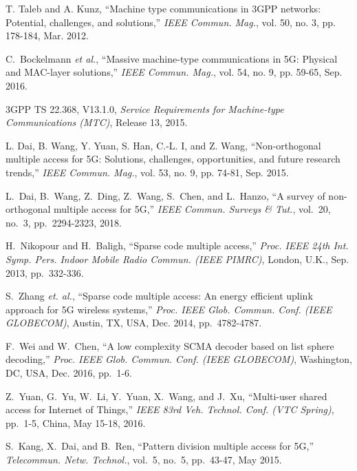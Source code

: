 \documentclass[journal]{IEEEtran}
\numberwithin{const2}{const}
\begin{document}
\begin{thebibliography}{1}
	
	T. Taleb and A. Kunz,
	``Machine type communications in 3GPP networks: Potential, challenges, and solutions,''
	\emph{IEEE Commun. Mag.}, vol. 50, no. 3, pp. 178-184, Mar. 2012.
	
	C.~Bockelmann \emph{et al.}, %
	``Massive machine-type communications in 5G: Physical and MAC-layer solutions,''
	\emph{IEEE Commun. Mag.}, vol. 54, no. 9, pp. 59-65, Sep. 2016.	
	
	3GPP TS 22.368, V13.1.0,
	\emph{Service Requirements for Machine-type Communications (MTC)}, Release 13, 2015.	
	
	L. Dai, B. Wang, Y. Yuan, S. Han, C.-L. I, and Z. Wang,
	``Non-orthogonal multiple access for 5G: Solutions, challenges, opportunities, and future research trends,''
	\emph{IEEE Commun. Mag.}, vol. 53, no. 9, pp. 74-81, Sep. 2015.
	
	L.~Dai, B.~Wang, Z.~Ding, Z.~Wang, S.~Chen, and L.~Hanzo,
	``A survey of non-orthogonal multiple access for 5G,''
	\emph{IEEE Commun. Surveys \& Tut.}, vol.~20, no.~3, pp.~2294-2323, 2018.
	
	H.~Nikopour and H.~Baligh,
	``Sparse code multiple access,''
	\emph{Proc. IEEE 24th Int. Symp. Pers. Indoor Mobile Radio Commun. (IEEE PIMRC)},
	London, U.K., Sep. 2013, pp.~332-336.
	
	S.~Zhang \emph{et. al.}, 
	``Sparse code multiple access: An energy efficient uplink approach for 5G wireless systems,''
	\emph{Proc. IEEE Glob. Commun. Conf. (IEEE GLOBECOM)},
	Austin, TX, USA, Dec. 2014, pp.~4782-4787.
	
	F.~Wei and W.~Chen,
	``A low complexity SCMA decoder based on list sphere decoding,''
	\emph{Proc. IEEE Glob. Commun. Conf. (IEEE GLOBECOM)},
	Washington, DC, USA, Dec. 2016, pp.~1-6.
	
	Z.~Yuan, G.~Yu, W.~Li, Y.~Yuan, X.~Wang, and J.~Xu,
	``Multi-user shared access for Internet of Things,''
	\emph{IEEE 83rd Veh. Technol. Conf. (VTC Spring)}, pp.~1-5, China, May 15-18, 2016.
	
	S.~Kang, X.~Dai, and B.~Ren,
	``Pattern division multiple access for 5G,''
	\emph{Telecommun. Netw. Technol.}, vol.~5, no.~5, pp.~43-47, May 2015.
	

\end{thebibliography}
\end{document}
